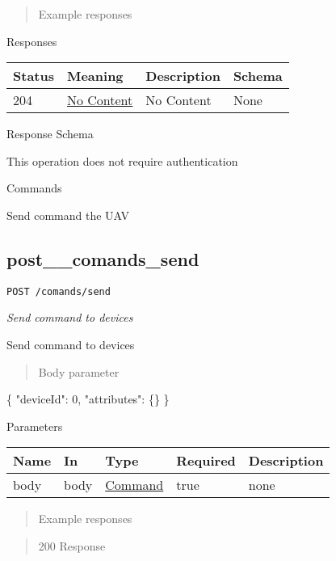 \documentclass[
]{article}
\newenvironment{Shaded}{}{}
\newcommand{\DataTypeTok}[1]{\textcolor[rgb]{0.56,0.13,0.00}{#1}}
\newcommand{\DecValTok}[1]{\textcolor[rgb]{0.25,0.63,0.44}{#1}}
\newcommand{\FunctionTok}[1]{\textcolor[rgb]{0.02,0.16,0.49}{#1}}
\begin{document}
\begin{quote}
Example responses
\end{quote}

Responses

\begin{longtable}[]{@{}llll@{}}
\toprule
Status & Meaning & Description & Schema\tabularnewline
\midrule
\endhead
204 & \href{https://tools.ietf.org/html/rfc7231\#section-6.3.5}{No
Content} & No Content & None\tabularnewline
\bottomrule
\end{longtable}

Response Schema

This operation does not require authentication

Commands

Send command the UAV

\hypertarget{post__comands_send}{%
\subsection{post\_\_comands\_send}\label{post__comands_send}}

\texttt{POST\ /comands/send}

\emph{Send command to devices}

Send command to devices

\begin{quote}
Body parameter
\end{quote}

\begin{Shaded}
\begin{Highlighting}[]
\FunctionTok{\{}
  \DataTypeTok{"deviceId"}\FunctionTok{:} \DecValTok{0}\FunctionTok{,}
  \DataTypeTok{"attributes"}\FunctionTok{:} \FunctionTok{\{\}}
\FunctionTok{\}}
\end{Highlighting}
\end{Shaded}

Parameters

\begin{longtable}[]{@{}lllll@{}}
\toprule
Name & In & Type & Required & Description\tabularnewline
\midrule
\endhead
body & body & \protect\hyperlink{schemacommand}{Command} & true &
none\tabularnewline
\bottomrule
\end{longtable}

\begin{quote}
Example responses
\end{quote}

\begin{quote}
200 Response
\end{quote}
\end{document}
